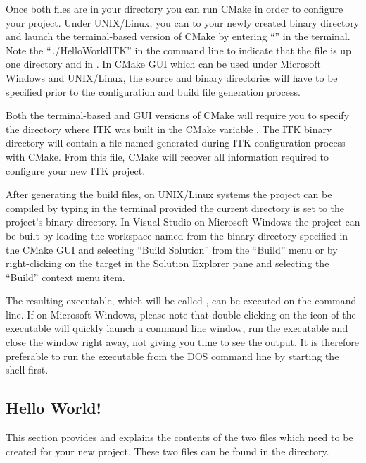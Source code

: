 Once both files are in your directory you can run CMake in order to configure
your project. Under UNIX/Linux, you can  to your newly created binary
directory and launch the terminal-based version of CMake by entering
``'' in the terminal. Note the
``../HelloWorldITK'' in the command line to indicate that the
 file is up one directory and in .
In CMake GUI which can be used under Microsoft Windows and UNIX/Linux, the
source and binary directories will have to be specified prior to the
configuration and build file generation process.

Both the terminal-based and GUI versions of CMake will require you to specify
the directory where ITK was built in the CMake variable . The ITK
binary directory will contain a file named  generated
during ITK configuration process with CMake. From this file, CMake will recover
all information required to configure your new ITK project.

After generating the build files, on UNIX/Linux systems the project can be
compiled by typing  in the terminal provided the current directory
is set to the project's binary directory. In Visual Studio on Microsoft Windows
the project can be built by loading the workspace named 
from the binary directory specified in the CMake GUI and selecting
``Build Solution'' from the ``Build'' menu or by right-clicking on
the  target in the Solution Explorer pane and selecting
the ``Build'' context menu item.

The resulting executable, which will be called , can be
executed on the command line. If on Microsoft Windows, please note that
double-clicking on the icon of the executable will quickly launch a command line
window, run the executable and close the window right away, not giving you time
to see the output. It is therefore preferable to run the executable from the DOS
command line by starting the  shell first.

\subsection{Hello World!}
\label{sec:HelloWorldITK}


This section provides and explains the contents of the two files which need to
be created for your new project. These two files can be found in the
 directory.


